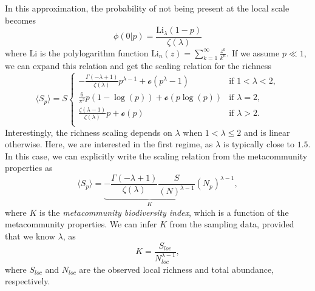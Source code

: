 \documentclass[%
 preprint,            %
 superscriptaddress, %
 amsmath,amssymb,    %
 aps,                %
 pra,                %
 floatfix,           %
]{revtex4-2}
\begin{document}
In this approximation, the probability of not being present at the local scale becomes
\begin{equation}
    \phi(0|p) =\frac{\text{Li}_{\lambda}(1-p)}{\zeta (\lambda)}
\end{equation}
where $\text{Li}$ is the polylogarithm function $\text{Li}_n(z)=\sum _{k=1}^{\infty } \frac{z^k}{k^n}$. If we assume $p\ll1$, we can expand this relation and get the scaling relation for the richness
\begin{equation}
  \langle S_{p} \rangle = S
\begin{cases} 
     -\frac{\Gamma (-\lambda+1 )}{\zeta (\lambda)} p^{\lambda-1} + \mathcal{o}(p^\lambda-1) & \text{if } 1 < \lambda <  2, \\
    \frac{6}{\pi ^2} p (1-\log (p)) + \mathcal{o}(p\log (p) )  & \text{if } \lambda =2, \\
    \frac{\zeta (\lambda-1 )}{\zeta (\lambda)} p + \mathcal{o}(p)  & \text{if } \lambda >  2. \\
\end{cases}
\end{equation}
Interestingly, the richness scaling depends on $\lambda$ when $1<\lambda \leq2$ and is linear otherwise. Here, we are interested in the first regime, as $\lambda$ is typically close to $1.5$. In this case, we can explicitly write the scaling relation from the metacommunity properties as
\begin{equation}
    \langle S_p \rangle =      \underbrace{-\frac{\Gamma (-\lambda+1 )}{\zeta (\lambda)} \frac{S}{(N)^{\lambda-1}}}_{K} (N_p)^{\lambda-1},
    \label{eq:HeapsTaraMM}
\end{equation}
where $K$ is the \emph{metacommunity biodiversity index}, which is a function of the metacommunity properties. We can infer $K$ from the sampling data, provided that we know $\lambda$, as
\begin{equation}
    K = \frac{S_{loc}}{N_{loc}^{\lambda-1}},
\end{equation}
where $S_{loc}$ and $N_{loc}$ are the observed local richness and total abundance, respectively.







\end{document}
